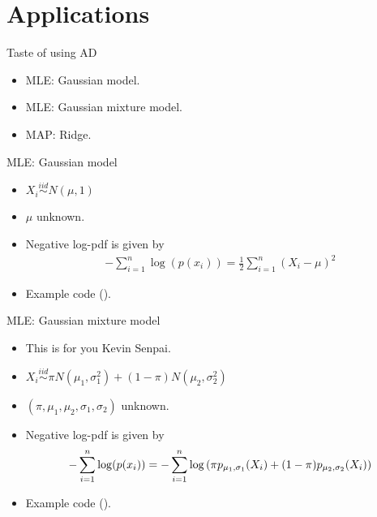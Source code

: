 \section{Applications}
\frame{\tableofcontents[currentsection]}

\begin{frame}{Taste of using AD}
\begin{itemize}
    \item MLE: Gaussian model.
    \item MLE: Gaussian mixture model.
    \item MAP: Ridge.
\end{itemize}
\end{frame}

\begin{frame}{MLE: Gaussian model}
\begin{itemize}
    \item $X_i \stackrel{iid}{\sim} N(\mu, 1)$ 
    \item $\mu$ unknown.
    \item Negative log-pdf is given by
    \begin{align*}
        -\sum\limits_{i=1}^n \log(p(x_i))
        =
        \frac{1}{2} \sum\limits_{i=1}^n (X_i - \mu)^2
    \end{align*}
    \item Example code (\href{https://github.com/JamesYang007/FastAD-Report/blob/master/slides/stanford-01272022/examples/src/mle.cpp}{}).
\end{itemize}
\end{frame}

\begin{frame}{MLE: Gaussian mixture model}
\begin{itemize}
    \item<2-> This is for you Kevin Senpai.
    \item<3-> $X_i \stackrel{iid}{\sim} \pi N(\mu_1, \sigma_1^2) + (1-\pi) N(\mu_2, \sigma_2^2)$ 
    \item<3-> $(\pi, \mu_1, \mu_2, \sigma_1, \sigma_2)$ unknown.
    \item<3-> Negative log-pdf is given by
    \begin{align*}
        -\sum\limits_{i=1}^n \log(p(x_i))
        =
        -\sum\limits_{i=1}^n \log\left(
            \pi p_{\mu_1, \sigma_1}(X_i)
            + (1-\pi) p_{\mu_2, \sigma_2}(X_i)
        \right)
    \end{align*}
    \item<3-> Example code (\href{https://github.com/JamesYang007/FastAD-Report/blob/master/slides/stanford-01272022/examples/src/kevin_senpai_mle.cpp}{}).
\end{itemize}
\end{frame}


